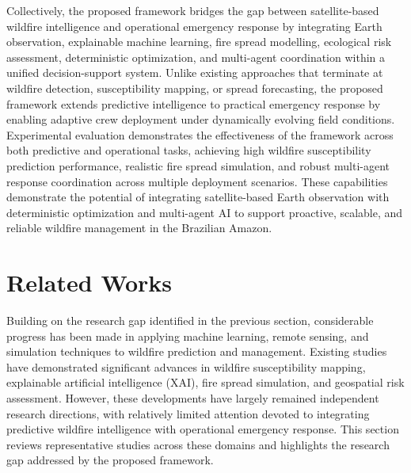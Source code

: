 \documentclass{ieeeaccess}
\begin{document}
Collectively, the proposed framework bridges the gap between satellite-based wildfire intelligence and operational emergency response by integrating Earth observation, explainable machine learning, fire spread modelling, ecological risk assessment, deterministic optimization, and multi-agent coordination within a unified decision-support system. Unlike existing approaches that terminate at wildfire detection, susceptibility mapping, or spread forecasting, the proposed framework extends predictive intelligence to practical emergency response by enabling adaptive crew deployment under dynamically evolving field conditions. Experimental evaluation demonstrates the effectiveness of the framework across both predictive and operational tasks, achieving high wildfire susceptibility prediction performance, realistic fire spread simulation, and robust multi-agent response coordination across multiple deployment scenarios. These capabilities demonstrate the potential of integrating satellite-based Earth observation with deterministic optimization and multi-agent AI to support proactive, scalable, and reliable wildfire management in the Brazilian Amazon.


\section{Related Works}

Building on the research gap identified in the previous section, considerable progress has been made in applying machine learning, remote sensing, and simulation techniques to wildfire prediction and management. Existing studies have demonstrated significant advances in wildfire susceptibility mapping, explainable artificial intelligence (XAI), fire spread simulation, and geospatial risk assessment. However, these developments have largely remained independent research directions, with relatively limited attention devoted to integrating predictive wildfire intelligence with operational emergency response. This section reviews representative studies across these domains and highlights the research gap addressed by the proposed framework.
\end{document}
